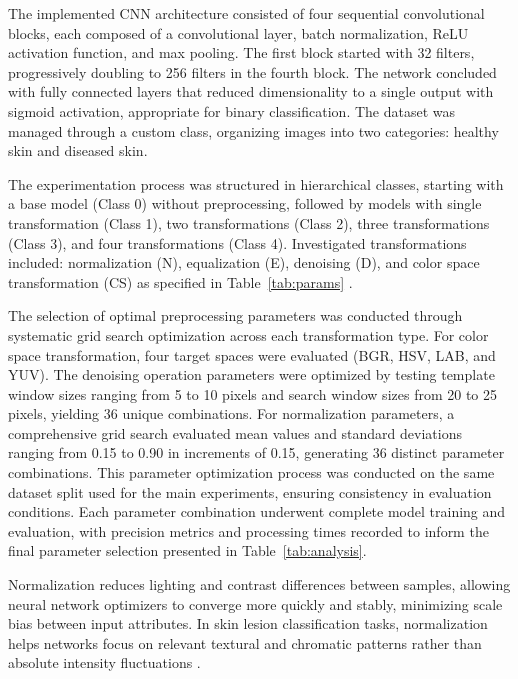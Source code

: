 \documentclass[journal]{IEEEtran}
\begin{document}
The implemented CNN architecture consisted of four sequential convolutional blocks, each composed of a convolutional layer, batch normalization, ReLU activation function, and max pooling. The first block started with 32 filters, progressively doubling to 256 filters in the fourth block. The network concluded with fully connected layers that reduced dimensionality to a single output with sigmoid activation, appropriate for binary classification. The dataset was managed through a custom class, organizing images into two categories: healthy skin and diseased skin.

The experimentation process was structured in hierarchical classes, starting with a base model (Class 0) without preprocessing, followed by models with single transformation (Class 1), two transformations (Class 2), three transformations (Class 3), and four transformations (Class 4). Investigated transformations included: normalization (N), equalization (E), denoising (D), and color space transformation (CS) as specified in Table~\ref{tab:params} \cite{Brinker2019, RODRIGUES2020103542, Tarawneh2024, computers8030062}.


The selection of optimal preprocessing parameters was conducted through systematic grid search optimization across each transformation type. For color space transformation, four target spaces were evaluated (BGR, HSV, LAB, and YUV). The denoising operation parameters were optimized by testing template window sizes ranging from 5 to 10 pixels and search window sizes from 20 to 25 pixels, yielding 36 unique combinations. For normalization parameters, a comprehensive grid search evaluated mean values and standard deviations ranging from 0.15 to 0.90 in increments of 0.15, generating 36 distinct parameter combinations. This parameter optimization process was conducted on the same dataset split used for the main experiments, ensuring consistency in evaluation conditions. Each parameter combination underwent complete model training and evaluation, with precision metrics and processing times recorded to inform the final parameter selection presented in Table~\ref{tab:analysis}.

Normalization reduces lighting and contrast differences between samples, allowing neural network optimizers to converge more quickly and stably, minimizing scale bias between input attributes. In skin lesion classification tasks, normalization helps networks focus on relevant textural and chromatic patterns rather than absolute intensity fluctuations \cite{irjet}.
\end{document}
